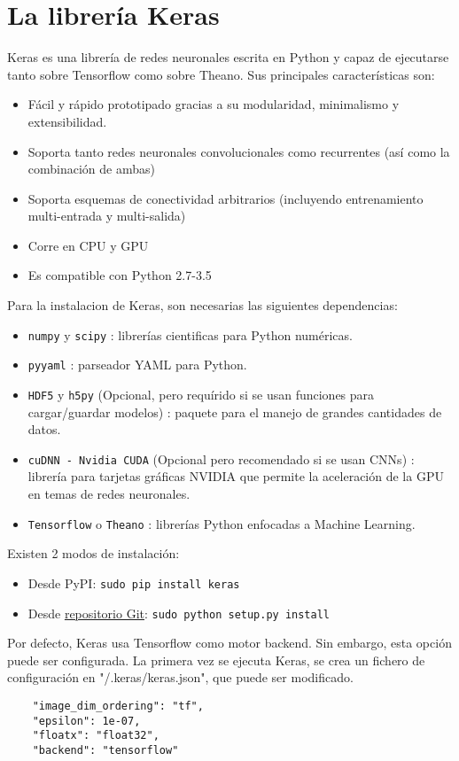 \chapter{La librería Keras}
Keras es una librería de redes neuronales escrita en Python y capaz de ejecutarse tanto sobre Tensorflow como sobre Theano. Sus principales características son:
\begin{itemize}[noitemsep]
\item Fácil y rápido prototipado gracias a su modularidad, minimalismo y extensibilidad.
\item Soporta tanto redes neuronales convolucionales como recurrentes (así como la combinación de ambas)
\item Soporta esquemas de conectividad arbitrarios (incluyendo entrenamiento multi-entrada y multi-salida)
\item Corre en CPU y GPU
\item Es compatible con Python 2.7-3.5
 \end{itemize}

 Para la instalacion de Keras, son necesarias las siguientes dependencias:
 \begin{itemize}[noitemsep]
\item \lstinline{numpy} y \lstinline{scipy} : librerías cientificas para Python numéricas.
\item \lstinline{pyyaml} : parseador YAML para Python.
\item \lstinline{HDF5} y \lstinline{h5py} (Opcional, pero requírido si se usan funciones para cargar/guardar modelos) : paquete para el manejo de grandes cantidades de datos.
\item \lstinline{cuDNN - Nvidia CUDA} (Opcional pero recomendado si se usan CNNs) : librería para tarjetas gráficas NVIDIA que permite la aceleración de la GPU en temas de redes neuronales.
\item \lstinline{Tensorflow} o \lstinline{Theano} : librerías Python enfocadas a Machine Learning.
 \end{itemize}
Existen 2 modos de instalación:
 \begin{itemize}[noitemsep]
 \item Desde PyPI: \lstinline{sudo pip install keras}
 \item Desde \href{https://github.com/fchollet/keras/tree/master/keras}{repositorio Git}: \lstinline{sudo python setup.py install}
 \end{itemize}
 Por defecto, Keras usa Tensorflow como motor backend. Sin embargo, esta opción puede ser configurada. La primera vez se ejecuta Keras, se crea un fichero de configuración en "/.keras/keras.json", que puede ser modificado.
\begin{lstlisting}
    "image_dim_ordering": "tf",
    "epsilon": 1e-07,
    "floatx": "float32",
    "backend": "tensorflow"
\end{lstlisting}

